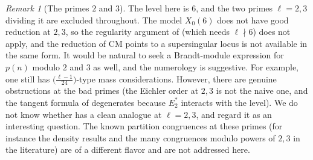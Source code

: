 \documentclass[12pt]{amsart}
\theoremstyle{definition}
\theoremstyle{remark}
\newtheorem{remark}{Remark}
\begin{document}
\begin{remark}[The primes $2$ and $3$]\label{rmk:23}
The level here is $6$, and the two primes $\ell=2,3$ dividing it are excluded throughout. The
model $X_0(6)$ does not have good reduction at $2,3$, so the regularity argument of
 (which needs $\ell\nmid6$) does not apply, and the reduction of CM points to a
supersingular locus is not available in the same form. It would be natural to seek a
Brandt-module expression for $p(n)$ modulo $2$ and $3$ as well, and the numerology is
suggestive. For example, one still has $\bigl(\tfrac{\ell-1}{24}\bigr)$-type mass considerations. However,
there are genuine obstructions at the bad primes (the Eichler order at $2,3$ is not the naive
one, and the tangent formula of  degenerates because $E_2^*$ interacts with
the level). We do not know whether  has a clean analogue at $\ell=2,3$, and
regard it as an interesting question. The known partition congruences at these primes (for
instance the density results and the many congruences modulo powers of $2,3$ in the
literature) are of a different flavor and are not addressed here.
\end{remark}
\end{document}
